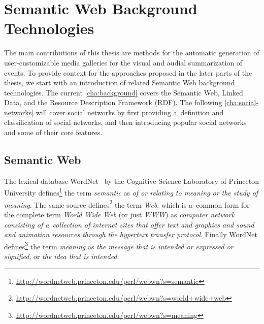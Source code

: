 

\chapter{Semantic Web Background Technologies} \label{cha:background}

\ifpdf
    \graphicspath{{2_background/figures/PNG/}{2_background/figures/PDF/}{2_background/figures/}}
\else
    \graphicspath{{2_background/figures/EPS/}{2_background/figures/}}
\fi


The main contributions of this thesis are methods for the automatic generation of
user-customizable media galleries for the visual and audial summarization of events.
To provide context for the approaches proposed in the later parts of the thesis,
we start with an introduction of related Semantic Web background technologies.
The current \autoref{cha:background} covers the Semantic Web, Linked Data,
and the Resource Description Framework (RDF).
The following \autoref{cha:social-networks} will cover social networks
by first providing a~definition and classification of social networks,
and then introducing popular social networks and some of their core features.

\section{Semantic Web}
The lexical database WordNet~\cite{Fellbaum1998} by the Cognitive Science Laboratory
of Princeton University defines\footnote{\url{http://wordnetweb.princeton.edu/perl/webwn?s=semantic}}
the term \emph{semantic} as \emph{of or relating to meaning or the study of meaning}.
The same source defines\footnote{\url{http://wordnetweb.princeton.edu/perl/webwn?s=world+wide+web}}
the term \emph{Web}, which is a~common form for the complete term \emph{World Wide Web} (or just \emph{WWW}) as
\emph{computer network consisting of a~collection of internet sites that offer text and graphics and
sound and animation resources through the hypertext transfer protocol}.
Finally WordNet defines\footnote{\url{http://wordnetweb.princeton.edu/perl/webwn?s=meaning}}
the term \emph{meaning} as \emph{the message that is intended or expressed or signified}, or
\emph{the idea that is intended}.

